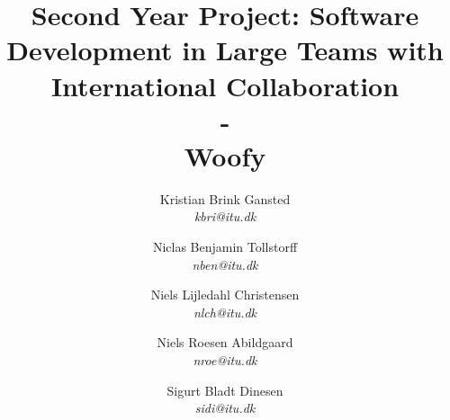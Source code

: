 \title{Second Year Project: Software Development in Large Teams with
International Collaboration\\-\\Woofy}
\author{Kristian Brink Gansted\\ \emph{kbri@itu.dk}
    \and Niclas Benjamin Tollstorff\\ \emph{nben@itu.dk}
    \and Niels Lijledahl Christensen\\ \emph{nlch@itu.dk}
    \and Niels Roesen Abildgaard\\ \emph{nroe@itu.dk}
    \and Sigurt Bladt Dinesen\\ \emph{sidi@itu.dk}}

\maketitle
